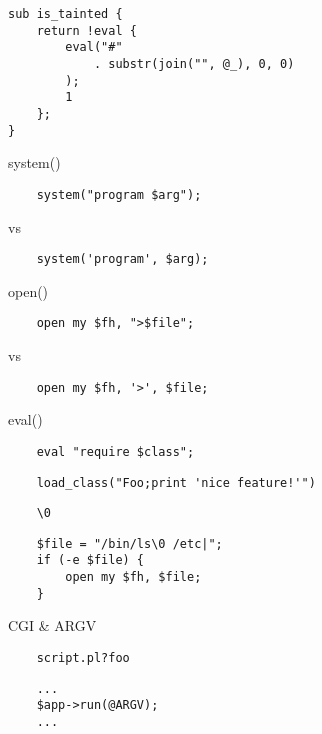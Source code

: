 \documentclass[14pt]{beamer}
\begin{document}
\begin{frame}[fragile]
    \begin{verbatim}
sub is_tainted {
    return !eval {
        eval("#"
            . substr(join("", @_), 0, 0)
        );
        1
    };
}
    \end{verbatim}
\end{frame}

\begin{frame}[fragile]{system()}
    \begin{verbatim}
    system("program $arg");
    \end{verbatim}
    vs
    \begin{verbatim}
    system('program', $arg);
    \end{verbatim}
\end{frame}

\begin{frame}[fragile]{open()}
    \begin{verbatim}
    open my $fh, ">$file";
    \end{verbatim}
    vs
    \begin{verbatim}
    open my $fh, '>', $file;
    \end{verbatim}
\end{frame}

\begin{frame}[fragile]{eval()}
    \begin{verbatim}
    eval "require $class";
    \end{verbatim}\pause
    \begin{verbatim}
    load_class("Foo;print 'nice feature!'")
    \end{verbatim}
\end{frame}

\begin{frame}[fragile]{0}
    \begin{verbatim}
    \0
    \end{verbatim}\pause
    \begin{verbatim}
    $file = "/bin/ls\0 /etc|";
    if (-e $file) {
        open my $fh, $file;
    }
    \end{verbatim}
\end{frame}

\begin{frame}[fragile]{CGI \& ARGV}
    \begin{verbatim}
    script.pl?foo
    \end{verbatim}\pause
    \begin{verbatim}
    ...
    $app->run(@ARGV);
    ...
    \end{verbatim}
\end{frame}
\end{document}

